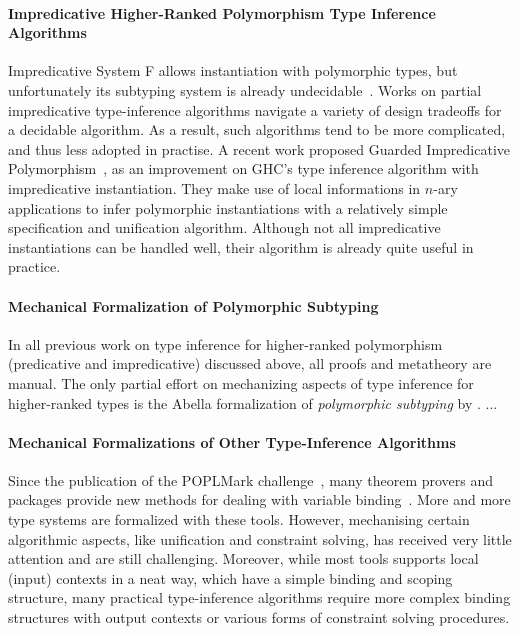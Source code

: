 \paragraph{Impredicative Higher-Ranked Polymorphism Type Inference Algorithms}
Impredicative System F allows instantiation with polymorphic types,
but unfortunately its subtyping system is already undecidable~\cite{tiuryn1996subtyping}.
Works on partial impredicative type-inference algorithms\cite{le2003ml,leijen2008hmf,vytiniotis2008fph}
navigate a variety of design tradeoffs for a decidable algorithm.
As a result, such algorithms tend to be more complicated, and thus less adopted in practise.
A recent work proposed Guarded Impredicative Polymorphism~\cite{},
as an improvement on GHC's type inference algorithm with impredicative instantiation.
They make use of local informations in $n$-ary applications to
infer polymorphic instantiations with a relatively simple specification and unification algorithm.
Although not all impredicative instantiations can be handled well,
their algorithm is already quite useful in practice.

\paragraph{Mechanical Formalization of Polymorphic Subtyping}
In all previous work on type inference for higher-ranked polymorphism
(predicative and impredicative) discussed above, all proofs and
metatheory are manual. The only partial effort on mechanizing aspects of type inference
for higher-ranked types is
the Abella formalization of \emph{polymorphic subtyping} by
\citet{itp2018}. ... 

\paragraph{Mechanical Formalizations of Other Type-Inference Algorithms}
Since the publication of the {\sc POPLMark} challenge~\cite{aydemir2005mechanized},
many theorem provers and packages provide new methods for dealing
with variable binding~\cite{aydemir2008engineering,urban2008nominalTech,chlipala2008parametric}.
More and more type systems are formalized with these tools.
However, mechanising certain algorithmic aspects, like unification and
constraint solving, has received very little attention and are still challenging.
Moreover, while most tools supports local (input) contexts in a neat way, which have a simple
binding and scoping structure, many practical type-inference algorithms require
more complex binding structures with output contexts or various forms of constraint solving procedures.

